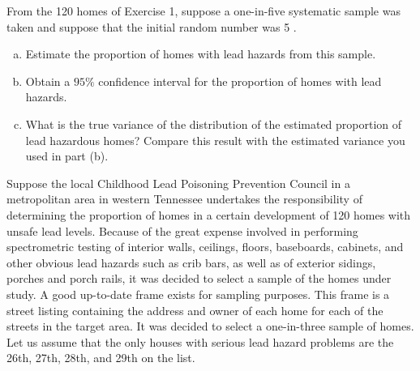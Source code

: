 \documentclass[12pt]{article}
\begin{document}
    \begin{exercise}[Levy-4.2(a-c)]
        From the 120 homes of Exercise 1, suppose a one-in-five systematic sample was taken and suppose that the initial random number was 5 .
        \begin{enumerate}[a.]
            \item Estimate the proportion of homes with lead hazards from this sample.
            \item Obtain a \(95 \%\) confidence interval for the proportion of homes with lead hazards.
            \item What is the true variance of the distribution of the estimated proportion of lead hazardous homes? Compare this result with the estimated variance you used in part (b).
        \end{enumerate}
    \end{exercise}

    \begin{exercise}[Exercise 4.1]
        Suppose the local Childhood Lead Poisoning Prevention Council in a metropolitan area in western Tennessee undertakes the responsibility of determining the proportion of homes in a certain development of 120 homes with unsafe lead levels. Because of the great expense involved in performing spectrometric testing of interior walls, ceilings, floors, baseboards, cabinets, and other obvious lead hazards such as crib bars, as well as of exterior sidings, porches and porch rails, it was decided to select a sample of the homes under study. A good up-to-date frame exists for sampling purposes. This frame is a street listing containing the address and owner of each home for each of the streets in the target area. It was decided to select a one-in-three sample of homes. Let us assume that the only houses with serious lead hazard problems are the 26th, 27th, 28th, and 29th on the list. 
    \end{exercise}
\end{document}
